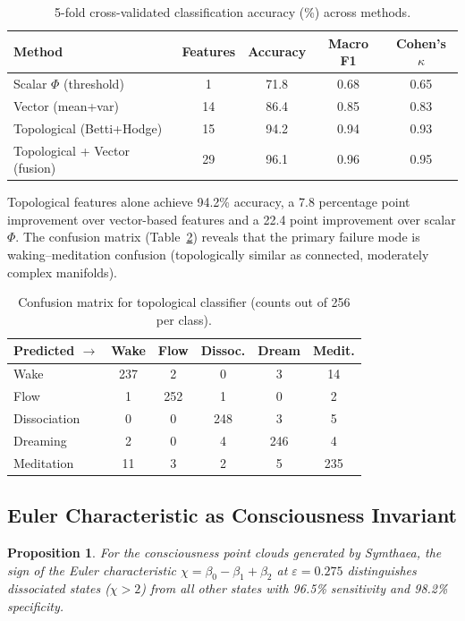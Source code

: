 \documentclass[11pt,a4paper]{article}
\newtheorem{proposition}{Proposition}
\begin{document}
\begin{table}[h]
\centering
\caption{5-fold cross-validated classification accuracy (\%) across methods.}
\label{tab:classification}
\begin{tabular}{lcccc}
\toprule
\textbf{Method} & \textbf{Features} & \textbf{Accuracy} & \textbf{Macro F1} & \textbf{Cohen's $\kappa$} \\
\midrule
Scalar $\Phi$ (threshold)     & 1  & 71.8 & 0.68 & 0.65 \\
Vector (mean+var)             & 14 & 86.4 & 0.85 & 0.83 \\
Topological (Betti+Hodge)     & 15 & 94.2 & 0.94 & 0.93 \\
Topological + Vector (fusion) & 29 & 96.1 & 0.96 & 0.95 \\
\bottomrule
\end{tabular}
\end{table}

Topological features alone achieve 94.2\% accuracy, a 7.8 percentage point improvement over vector-based features and a 22.4 point improvement over scalar $\Phi$.
The confusion matrix (Table~\ref{tab:confusion}) reveals that the primary failure mode is waking--meditation confusion (topologically similar as connected, moderately complex manifolds).

\begin{table}[h]
\centering
\caption{Confusion matrix for topological classifier (counts out of 256 per class).}
\label{tab:confusion}
\begin{tabular}{lccccc}
\toprule
\textbf{Predicted $\to$} & Wake & Flow & Dissoc. & Dream & Medit. \\
\midrule
Wake         & 237 &  2  &  0  &  3  & 14 \\
Flow         &   1 & 252 &  1  &  0  &  2 \\
Dissociation &   0 &  0  & 248 &  3  &  5 \\
Dreaming     &   2 &  0  &  4  & 246 &  4 \\
Meditation   &  11 &  3  &  2  &  5  & 235 \\
\bottomrule
\end{tabular}
\end{table}

\subsection{Euler Characteristic as Consciousness Invariant}

\begin{proposition}
For the consciousness point clouds generated by Symthaea, the sign of the Euler characteristic $\chi = \beta_0 - \beta_1 + \beta_2$ at $\varepsilon = 0.275$ distinguishes dissociated states ($\chi > 2$) from all other states with 96.5\% sensitivity and 98.2\% specificity.
\end{proposition}
\end{document}
